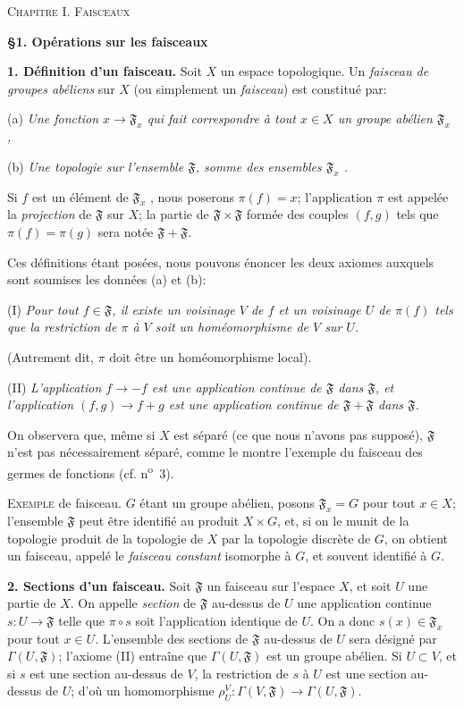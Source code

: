 \textsc{Chapitre I. Faisceaux}


\textbf{\S1. Opérations sur les faisceaux}

\textbf{1. Définition d'un faisceau.} Soit $X$ un espace topologique. Un \textit{faisceau de groupes abéliens} sur $X$ (ou simplement un \textit{faisceau}) est constitué par:

(a) \textit{Une fonction $x \to \mathfrak{F}_x$ qui fait correspondre à tout $x \in X$ un groupe abélien $\mathfrak{F}_x$ ,}

(b) \textit{Une topologie sur l'ensemble $\mathfrak{F}$, somme des ensembles $\mathfrak{F}_x$ .}

Si $f$ est un élément de $\mathfrak{F}_x$ , nous poserons $\pi(f) = x$; l'application $\pi$ est appelée la \textit{projection} de $\mathfrak{F}$ sur $X$; la partie de $\mathfrak{F} \times \mathfrak{F}$ formée des couples $(f, g)$ tels que $\pi(f) = \pi(g)$ sera notée $\mathfrak{F} + \mathfrak{F}$.

Ces définitions étant posées, nous pouvons énoncer les deux axiomes auxquels sont soumises les données (a) et (b):

(I) \textit{Pour tout $f \in \mathfrak{F}$, il existe un voisinage $V$ de $f$ et un voisinage $U$ de $\pi(f)$ tels que la restriction de $\pi$ à $V$ soit un homéomorphisme de $V$ sur $U$.}

(Autrement dit, $\pi$ doit être un homéomorphisme local).

(II) \textit{L'application $f \to -f$ est une application continue de $\mathfrak{F}$ dans $\mathfrak{F}$, et l'application $(f, g) \to f + g$ est une application continue de $\mathfrak{F} + \mathfrak{F}$ dans $\mathfrak{F}$.}

On observera que, même si $X$ est séparé (ce que nous n'avons pas supposé), $\mathfrak{F}$ n'est pas nécessairement séparé, comme le montre l'exemple du faisceau des germes de fonctions (cf. n\textsuperscript{o}~3).

\textsc{Exemple} de faisceau. $G$ étant un groupe abélien, posons $\mathfrak{F}_x = G$ pour tout $x \in X$; l'ensemble $\mathfrak{F}$ peut être identifié au produit $X \times G$, et, si on le munit de la topologie produit de la topologie de $X$ par la topologie discrète de $G$, on obtient un faisceau, appelé le \textit{faisceau constant} isomorphe à $G$, et souvent identifié à $G$.

\textbf{2. Sections d'un faisceau.} Soit $\mathfrak{F}$ un faisceau sur l'espace $X$, et soit $U$ une partie de $X$. On appelle \textit{section} de $\mathfrak{F}$ au-dessus de $U$ une application continue $s: U \to \mathfrak{F}$ telle que $\pi \circ s$ soit l'application identique de $U$. On a donc $s(x) \in \mathfrak{F}_x$ pour tout $x \in U$. L'ensemble des sections de $\mathfrak{F}$ au-dessus de $U$ sera désigné par $\Gamma(U, \mathfrak{F})$; l'axiome (II) entraîne que $\Gamma(U, \mathfrak{F})$ est un groupe abélien. Si $U \subset V$, et si $s$ est une section au-dessus de $V$, la restriction de $s$ à $U$ est une section au-dessus de $U$; d'où un homomorphisme $\rho_U^V: \Gamma(V, \mathfrak{F}) \to \Gamma(U, \mathfrak{F})$.

